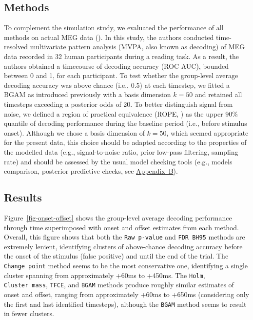 \documentclass[
  doc,
  floatsintext,
  longtable,
  a4paper,
  nolmodern,
  notxfonts,
  notimes,
  colorlinks=true,linkcolor=blue,citecolor=blue,urlcolor=blue]{apa7}
\begin{document}
\subsection{Methods}\label{methods-1}

To complement the simulation study, we evaluated the performance of all
methods on actual MEG data (). In this study, the authors conducted
time-resolved multivariate pattern analysis (MVPA, also known as
decoding) of MEG data recorded in 32 human participants during a reading
task. As a result, the authors obtained a timecourse of decoding
accuracy (ROC AUC), bounded between 0 and 1, for each participant. To
test whether the group-level average decoding accuracy was above chance
(i.e., 0.5) at each timestep, we fitted a BGAM as introduced previously
with a basis dimension \(k=50\) and retained all timesteps exceeding a
posterior odds of 20. To better distinguish signal from noise, we
defined a region of practical equivalence (ROPE,
) as the upper
90\% quantile of decoding performance during the baseline period (i.e.,
before stimulus onset). Although we chose a basis dimension of \(k=50\),
which seemed appropriate for the present data, this choice should be
adapted according to the properties of the modelled data (e.g.,
signal-to-noise ratio, prior low-pass filtering, sampling rate) and
should be assessed by the usual model checking tools (e.g., models
comparison, posterior predictive checks, see
\hyperref[apx-basis]{Appendix~B}).

\subsection{Results}\label{results-1}

Figure~\ref{fig-onset-offset} shows the group-level average decoding
performance through time superimposed with onset and offset estimates
from each method. Overall, this figure shows that both the
\texttt{Raw\ p-value} and \texttt{FDR\ BH95} methods are extremely
lenient, identifying clusters of above-chance decoding accuracy before
the onset of the stimulus (false positive) and until the end of the
trial. The \texttt{Change\ point} method seems to be the most
conservative one, identifying a single cluster spanning from
approximately +60ms to +450ms. The \texttt{Holm},
\texttt{Cluster\ mass}, \texttt{TFCE}, and \texttt{BGAM} methods produce
roughly similar estimates of onset and offset, ranging from
approximately +60ms to +650ms (considering only the first and last
identified timesteps), although the \texttt{BGAM} method seems to result
in fewer clusters.
\end{document}

